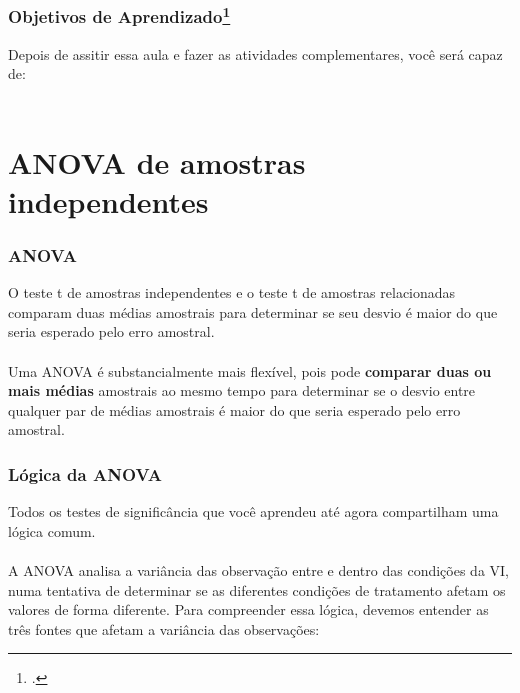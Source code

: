 \documentclass[11pt]{beamer}
\begin{document}
\begin{frame}
\frametitle{Objetivos de Aprendizado\footcite{carlson2017introduction}}
  Depois de assitir essa aula e fazer as atividades complementares, você será capaz de:
  \\~\\
  \begin{itemize}
  \end{itemize}
\end{frame}

\section{ANOVA de amostras independentes}
\begin{frame}
\frametitle{ANOVA}
O teste t de amostras independentes e o teste t de amostras relacionadas comparam duas médias amostrais para determinar se seu desvio é maior do que seria esperado pelo erro amostral. \\~\\

Uma ANOVA é substancialmente mais flexível, pois pode \textbf{comparar duas ou mais médias} amostrais ao mesmo tempo para determinar se o desvio entre qualquer par de médias amostrais é maior do que seria esperado pelo erro amostral.

\end{frame}

\begin{frame}
\frametitle{Lógica da ANOVA}
Todos os testes de significância que você aprendeu até agora  compartilham uma lógica comum. \\~\\ 

A ANOVA analisa a variância das observação entre e dentro das condições da VI, numa tentativa de determinar se as diferentes condições de tratamento afetam os valores de forma diferente. Para compreender essa lógica, devemos entender as três fontes que afetam a variância das observações:
\end{frame}
\end{document}
